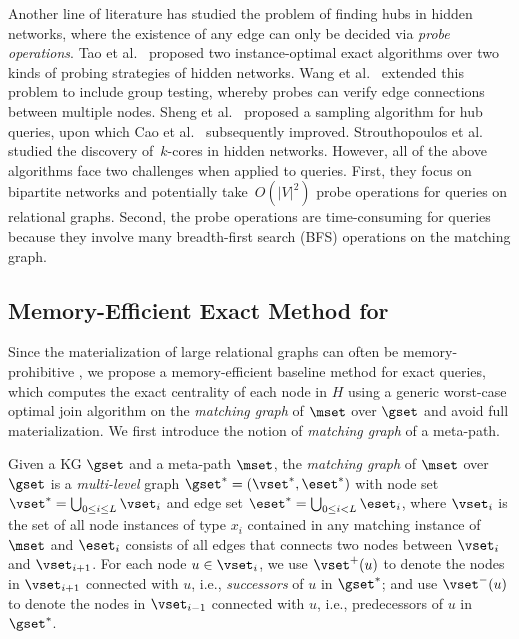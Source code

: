 \vspace{1mm}
Another line of literature has studied the problem of finding hubs in hidden networks, where the existence of any edge can only be decided via \emph{probe operations}.
Tao et al.~\cite{tao2010finding} proposed two instance-optimal exact algorithms over two kinds of probing strategies of hidden networks.
Wang et al.~\cite{wang2012identifying} extended this problem to include group testing, whereby probes can verify edge connections between multiple nodes.
Sheng et al.~\cite{sheng2012exact} proposed a sampling algorithm for hub queries, upon which Cao et al.~\cite{cao2015top} subsequently improved.
Strouthopoulos et al.~\cite{StrouthopoulosP19} studied the discovery of~$k$-cores in hidden networks.
However, all of the above algorithms face two challenges when applied to \ced queries.
First, they focus on bipartite networks and potentially take~$O(|V|^2)$ probe operations for \ced queries on relational graphs.
Second, the probe operations are time-consuming for \ced queries because they involve many breadth-first search (BFS) operations on the matching graph.

\subsection{Memory-Efficient Exact Method for \ced}
\label{sec:wcoj}

Since the materialization of large relational graphs can often be memory-prohibitive \cite{xirogiannopoulos2017extracting}, we propose a memory-efficient baseline method for exact \ced queries, which computes the exact centrality of each node in $H$ using a generic worst-case optimal join algorithm \cite{ngo2018worst, freitag2020adopting, arroyuelo2021worst, veldhuizen2014leapfrog} on the \emph{matching graph} of $\mset$ over $\gset$ and avoid full materialization.
We first introduce the notion of \emph{matching graph} of a meta-path.
\begin{definition}
  Given a KG $\gset$ and a meta-path $\mset$, the \emph{matching graph} of $\mset$ over $\gset$ is a \emph{multi-level} graph $\gset^*=(\vset^*,\eset^*)$ with node set $\vset^*=\bigcup_{0 \leq i \leq L}{\vset_i}$ and edge set $\eset^* = \bigcup_{0 \leq i < L}{\eset_i}$, where $\vset_i$ is the set of all node instances of type $x_i$ contained in any matching instance of $\mset$ and $\eset_i$ consists of all edges that connects two nodes between $\vset_i$ and $\vset_{i+1}$. For each node $u\in\vset_i$, we use $\vset^+(u)$ to denote the nodes in $\vset_{i+1}$ connected with $u$, i.e., \emph{successors} of $u$ in $\gset^*$; and use $\vset^-(u)$ to denote the nodes in $\vset_{i-1}$ connected with $u$, i.e., predecessors of $u$ in $\gset^*$.
\end{definition}

